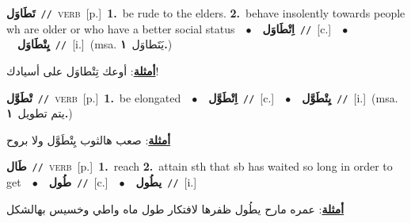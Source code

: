 \documentclass[10pt,a4paper,twoside]{article} %
\begin{document}
\begin{multicols}{2}
{\setlength\topsep{0pt}\textbf{\foreignlanguage{arabic}{تَطَاوَل}}\ {\color{gray}\texttt{//}\color{black}}\ \textsc{verb}\ [p.]\ \textbf{1.}~be rude to the elders.  \textbf{2.}~behave insolently towards people wh are older or who have a better social status\ \ $\bullet$\ \ \setlength\topsep{0pt}\textbf{\foreignlanguage{arabic}{اِتْطَاوَل}}\ {\color{gray}\texttt{//}\color{black}}\ [c.]\ \ $\bullet$\ \ \setlength\topsep{0pt}\textbf{\foreignlanguage{arabic}{يِتْطَاوَل}}\ {\color{gray}\texttt{//}\color{black}}\ [i.]\ \color{gray}(msa. \foreignlanguage{arabic}{يَتَطاوَل}~\foreignlanguage{arabic}{\textbf{١.}})\color{black}\  \begin{flushright}\color{gray}\foreignlanguage{arabic}{\textbf{\underline{\foreignlanguage{arabic}{أمثلة}}}: أوعك تِتْطاوَل على أسيادك!}\end{flushright}\color{black}} \vspace{2mm}

{\setlength\topsep{0pt}\textbf{\foreignlanguage{arabic}{تْطَوَّل}}\ {\color{gray}\texttt{//}\color{black}}\ \textsc{verb}\ [p.]\ \textbf{1.}~be elongated\ \ $\bullet$\ \ \setlength\topsep{0pt}\textbf{\foreignlanguage{arabic}{اِتْطَوَّل}}\ {\color{gray}\texttt{//}\color{black}}\ [c.]\ \ $\bullet$\ \ \setlength\topsep{0pt}\textbf{\foreignlanguage{arabic}{يِتْطَوَّل}}\ {\color{gray}\texttt{//}\color{black}}\ [i.]\ \color{gray}(msa. \foreignlanguage{arabic}{يتم تطويل}~\foreignlanguage{arabic}{\textbf{١.}})\color{black}\  \begin{flushright}\color{gray}\foreignlanguage{arabic}{\textbf{\underline{\foreignlanguage{arabic}{أمثلة}}}: صعب هالثوب يِتْطَوَّل ولا بروح}\end{flushright}\color{black}} \vspace{2mm}

{\setlength\topsep{0pt}\textbf{\foreignlanguage{arabic}{طَال}}\ {\color{gray}\texttt{//}\color{black}}\ \textsc{verb}\ [p.]\ \textbf{1.}~reach  \textbf{2.}~attain sth that sb has waited so long in order to get\ \ $\bullet$\ \ \setlength\topsep{0pt}\textbf{\foreignlanguage{arabic}{طُول}}\ {\color{gray}\texttt{//}\color{black}}\ [c.]\ \ $\bullet$\ \ \setlength\topsep{0pt}\textbf{\foreignlanguage{arabic}{يطُول}}\ {\color{gray}\texttt{//}\color{black}}\ [i.]\  \begin{flushright}\color{gray}\foreignlanguage{arabic}{\textbf{\underline{\foreignlanguage{arabic}{أمثلة}}}: عمره مارح يطُول ظفرها لافتكار طول ماه واطي وخسيس بهالشكل}\end{flushright}\color{black}} \vspace{2mm}


\end{multicols}
\end{document}
